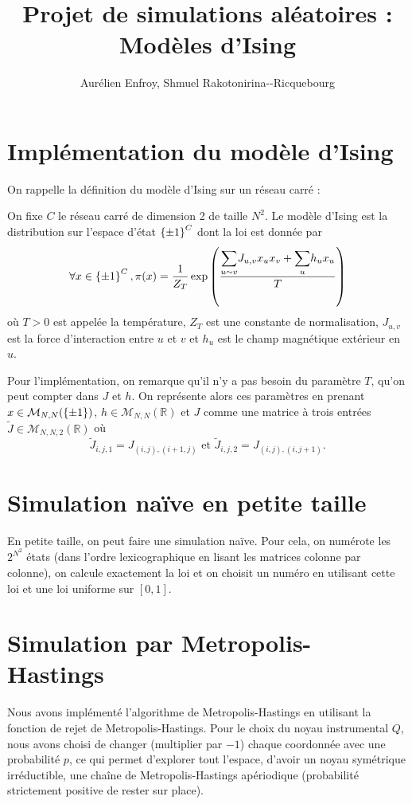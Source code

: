 \documentclass[a4paper,11pt]{article}
\title{Projet de simulations aléatoires : Modèles d'Ising}
\author{Aurélien Enfroy, Shmuel Rakotonirina{-}-Ricquebourg}
\begin{document}
\maketitle

\section{Implémentation du modèle d'Ising}

On rappelle la définition du modèle d'Ising sur un réseau carré :
\begin{definition}
On fixe $C$ le réseau carré de dimension 2 de taille $N^2$. Le modèle d'Ising est la distribution sur l'espace d'état $\left\lbrace \pm 1 \right\rbrace^C$ dont la loi est donnée par
$$\forall x \in \left\lbrace \pm 1 \right\rbrace^C, \pi(x) = \frac{1}{Z_T} \exp \left( \frac{\displaystyle{\sum_{u\sim v}^{}} J_{u,v} x_{u} x_{v} + \displaystyle{\sum_{u}^{}} h_{u} x_{u}}{T} \right)$$
où $T>0$ est appelée la température, $Z_T$ est une constante de normalisation, $J_{u,v}$ est la force d'interaction entre $u$ et $v$ et $h_{u}$ est le champ magnétique extérieur en $u$.
\end{definition}

Pour l'implémentation, on remarque qu'il n'y a pas besoin du paramètre $T$, qu'on peut compter dans $J$ et $h$. On représente alors ces paramètres en prenant $x \in \mathcal M_{N,N}(\left\lbrace \pm 1 \right\rbrace)$, $h \in \mathcal M_{N,N}(\mathbb R)$ et $J$ comme une matrice à trois entrées $\tilde J \in \mathcal M_{N,N,2}(\mathbb R)$ où
$$\tilde J_{i,j,1} = J_{(i,j),(i+1,j)} \text{ et } \tilde J_{i,j,2} = J_{(i,j),(i,j+1)}.$$

\section{Simulation naïve en petite taille}

En petite taille, on peut faire une simulation naïve. Pour cela, on numérote les $2^{N^2}$ états (dans l'ordre lexicographique en lisant les matrices colonne par colonne), on calcule exactement la loi et on choisit un numéro en utilisant cette loi et une loi uniforme sur $[0,1]$.

\section{Simulation par Metropolis-Hastings}

Nous avons implémenté l'algorithme de Metropolis-Hastings en utilisant la fonction de rejet de Metropolis-Hastings. Pour le choix du noyau instrumental $Q$, nous avons choisi de changer (multiplier par $-1$) chaque coordonnée avec une probabilité $p$, ce qui permet d'explorer tout l'espace, d'avoir un noyau symétrique irréductible, une chaîne de Metropolis-Hastings apériodique (probabilité strictement positive de rester sur place).
\end{document}
